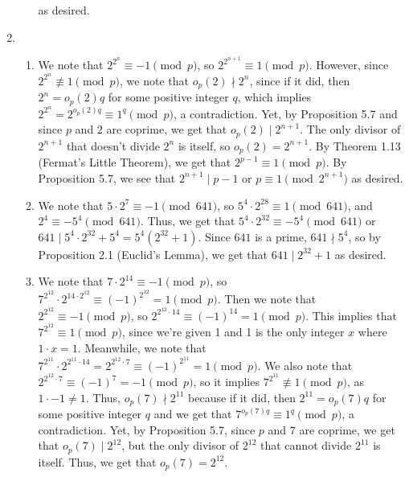 \documentclass{article}
\begin{document}
\begin{enumerate}[leftmargin=*, label=\arabic*.]
\begin{enumerate}[label=\alph*)]
    as desired.


    \end{enumerate}
\newpage

\item 
\begin{enumerate}[label=\alph*)]
    \item 
   We note that $2^{2^n} \equiv -1 \pmod p$, so $2^{2^{n+1}} \equiv 1 \pmod p$. However, since $2^{2^n} \not\equiv 1 \pmod p$, we note that $o_p(2) \nmid 2^n$, since if it did, then $2^n = o_p(2)q$ for some positive integer $q$, which implies $2^{2^n} = 2^{o_p(2)q} \equiv 1^q \pmod p$, a contradiction. Yet, by Proposition 5.7 and since $p$ and $2$ are coprime, we get that $o_p(2) \mid 2^{n+1}$. The only divisor of $2^{n+1}$ that doesn't divide $2^n$ is itself, so $o_p(2) = 2^{n+1}$. By Theorem 1.13 (Fermat's Little Theorem), we get that $2^{p - 1} \equiv 1 \pmod p$. By Proposition 5.7, we see that $2^{n+1} \mid p - 1$ or $p \equiv 1 \pmod{2^{n+1}}$ as desired.
  \\

    \item 
    We note that $5\cdot 2^7 \equiv -1 \pmod{641}$, so $5^4 \cdot 2^{28} \equiv 1 \pmod{641}$, and $2^4 \equiv -5^4 \pmod{641}$. Thus, we get that $5^4\cdot2^{32} \equiv -5^4 \pmod{641}$ or $641 \mid 5^4\cdot 2^{32} + 5^4 = 5^4(2^{32} + 1)$. Since $641$ is a prime, $641 \nmid 5^4$, so by Proposition 2.1 (Euclid's Lemma), we get that $641\mid 2^{32} + 1$ as desired. \\


    \item 
    We note that $7 \cdot 2^{14} \equiv -1 \pmod p$, so 
    $7^{2^{12}} \cdot 2^{14\cdot 2^{12}} \equiv (-1)^{2^{12}} = 1 \pmod p$. Then we note that $2^{2^{12}} \equiv -1 \pmod p$, so $2^{2^{12}\cdot 14} \equiv (-1)^{14} = 1 \pmod p$. This implies that $7^{2^{12}} \equiv 1 \pmod p$, since we're given 1 and 1 is the only integer $x$ where $1 \cdot x = 1$. Meanwhile, we note that $7^{2^{11}}\cdot 2^{2^{11}\cdot 14} = 2^{2^{12}\cdot 7} \equiv (-1)^{2^{11}} = 1 \pmod p$. We also note that $2^{2^{12}\cdot7}\equiv (-1)^7 = -1 \pmod p$, so it implies $7^{2^{11}} \not \equiv 1 \pmod p$, as $1 \cdot -1 \neq 1$. Thus, $o_p(7) \nmid 2^{11}$ because if it did, then $2^{11} = o_p(7)q$ for some positive integer $q$ and we get that $7^{o_p(7)q} \equiv 1^q \pmod p$, a contradiction. Yet, by Proposition 5.7, since $p$ and $7$ are coprime, we get that $o_p(7) \mid 2^{12}$, but the only divisor of $2^{12}$ that cannot divide $2^{11}$ is itself. Thus, we get that $o_p(7) = 2^{12}$.


\end{enumerate}
\end{enumerate}
\end{document}
